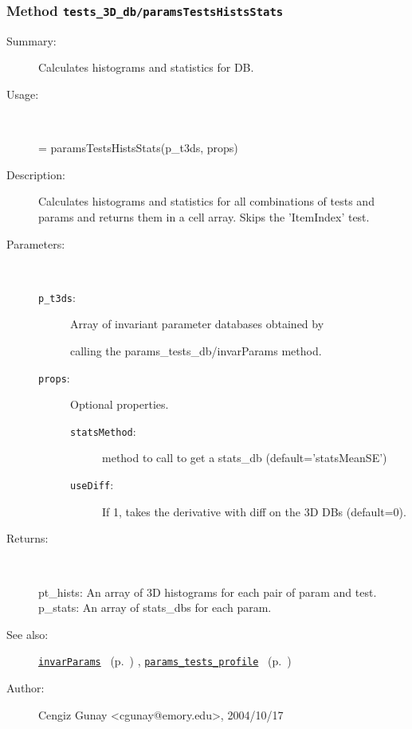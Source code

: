 \subsubsection[Method \texttt{paramsTestsHistsStats}]{Method \texttt{tests\_3D\_db/paramsTestsHistsStats}}%
%
\label{ref_tests_3D_db__paramsTestsHistsStats}%
\hypertarget{ref_tests_3D_db__paramsTestsHistsStats}{}%
\begin{description}
\item[Summary:]Calculates histograms and statistics for DB.
%
\item[Usage:]~%
\begin{lyxcode}%
[pt\_hists, p\_stats] = paramsTestsHistsStats(p\_t3ds, props)
%
\end{lyxcode}%
%
\item[Description:]%
Calculates histograms and statistics for all combinations of tests 
 and params and returns them in a cell array. Skips the 'ItemIndex' test.
\item[Parameters:]~
\begin{description}%
\item[\texttt{p\_t3ds}:]
 Array of invariant parameter databases obtained by

calling the params\_tests\_db/invarParams method.\item[\texttt{props}:]
 Optional properties.
\begin{description}%
\item[\texttt{statsMethod}:]
 method to call to get a stats\_db (default='statsMeanSE')
\item[\texttt{useDiff}:]
 If 1, takes the derivative with diff on the 3D DBs (default=0).
\end{description}%
\end{description}%
%
\item[Returns:]~

	pt\_hists: An array of 3D histograms for each pair of param 
		  and test.
	p\_stats: An array of stats\_dbs for each param.
%
%
\item[See also:]%
\hyperlink{ref_invarParams}{\texttt{invarParams}}%
\ (p.~\pageref{ref_invarParams})%
%
, \hyperlink{ref_params_tests_profile}{\texttt{params\_tests\_profile}}%
\ (p.~\pageref{ref_params_tests_profile})%
%
%
\item[Author:]%
Cengiz Gunay <cgunay@emory.edu>, 2004/10/17%
\end{description}
\methodline%
